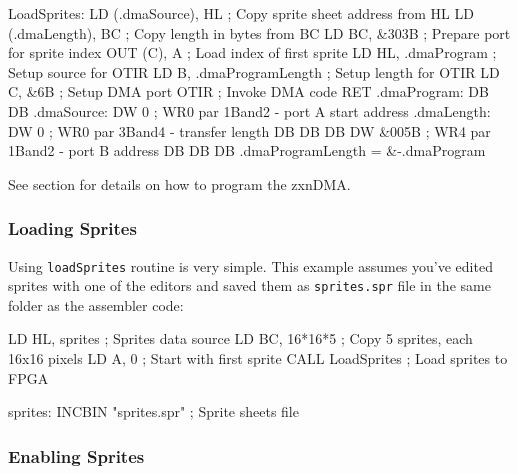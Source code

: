 \begin{tcblisting}{}
LoadSprites:
    LD (.dmaSource), HL     ; Copy sprite sheet address from HL
    LD (.dmaLength), BC     ; Copy length in bytes from BC
    LD BC, &303B            ; Prepare port for sprite index
    OUT (C), A              ; Load index of first sprite
    LD HL, .dmaProgram      ; Setup source for OTIR
    LD B, .dmaProgramLength ; Setup length for OTIR
    LD C, &6B               ; Setup DMA port
    OTIR                    ; Invoke DMA code
    RET
.dmaProgram:
    DB %
    DB %
.dmaSource:
    DW 0                    ; WR0 par 1Band2 - port A start address
.dmaLength:
    DW 0                    ; WR0 par 3Band4 - transfer length
    DB %
    DB %
    DB %
    DW &005B                ; WR4 par 1Band2 - port B address
    DB %
    DB %
    DB %
.dmaProgramLength = &-.dmaProgram
\end{tcblisting}

See section  for details on how to program the zxnDMA.


\pagebreak
\subsubsection{Loading Sprites}

Using {\tt loadSprites} routine is very simple. This example assumes you've edited sprites with one of the editors and saved them as {\tt sprites.spr} file in the same folder as the assembler code:

\begin{tcblisting}{}
    LD HL, sprites          ; Sprites data source
    LD BC, 16*16*5          ; Copy 5 sprites, each 16x16 pixels
    LD A, 0                 ; Start with first sprite
    CALL LoadSprites        ; Load sprites to FPGA
    
sprites:
    INCBIN "sprites.spr"    ; Sprite sheets file
\end{tcblisting}


\subsubsection{Enabling Sprites}

